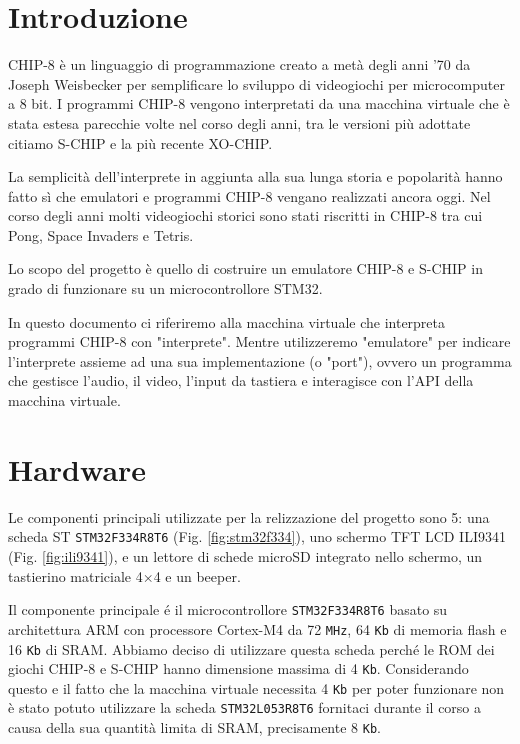 \documentclass[a4paper]{article}
\begin{document}
\setlength{\parindent}{0pt}
\setlength{\parskip}{0.8em}
\linespread{1.5}


\section{Introduzione}


CHIP-8 è un linguaggio di programmazione creato a metà degli anni '70
da Joseph Weisbecker per semplificare lo sviluppo di videogiochi per
microcomputer a 8 bit. I programmi CHIP-8 vengono interpretati da una
macchina virtuale che è stata estesa parecchie volte nel corso degli
anni, tra le versioni più adottate citiamo S-CHIP e la più recente
XO-CHIP.

La semplicità dell'interprete in aggiunta alla sua lunga storia e
popolarità hanno fatto sì che emulatori e programmi CHIP-8 vengano
realizzati ancora oggi.
Nel corso degli anni molti videogiochi storici sono stati riscritti
in CHIP-8 tra cui Pong, Space Invaders e Tetris.

Lo scopo del progetto è quello di costruire un emulatore CHIP-8 e
S-CHIP in grado di funzionare su un microcontrollore STM32.

In questo documento ci riferiremo alla macchina virtuale che
interpreta programmi CHIP-8 con "interprete". Mentre utilizzeremo
"emulatore" per indicare l'interprete assieme ad una sua
implementazione (o "port"), ovvero un programma che gestisce
l'audio, il video, l'input da tastiera e interagisce con l'API della
macchina virtuale.


\section{Hardware}

Le componenti principali utilizzate per la relizzazione del progetto sono 5:
una scheda ST \texttt{STM32F334R8T6} (Fig. \ref{fig:stm32f334}), uno schermo
TFT LCD ILI9341 (Fig. \ref{fig:ili9341}), e un lettore di schede microSD
integrato nello schermo, un tastierino matriciale 4$\times$4 e un beeper.

Il componente principale é il microcontrollore \texttt{STM32F334R8T6} basato su
architettura ARM con processore Cortex-M4 da 72 \texttt{MHz}, 64 \texttt{Kb} di
memoria flash e 16 \texttt{Kb} di SRAM. Abbiamo deciso di utilizzare questa
scheda perché le ROM dei giochi CHIP-8 e S-CHIP hanno dimensione massima di 4
\texttt{Kb}. Considerando questo e il fatto che la macchina virtuale necessita
4 \texttt{Kb} per poter funzionare non è stato potuto utilizzare la scheda
\texttt{STM32L053R8T6} fornitaci durante il corso a causa della sua quantità
limita di SRAM, precisamente 8 \texttt{Kb}.
\end{document}
